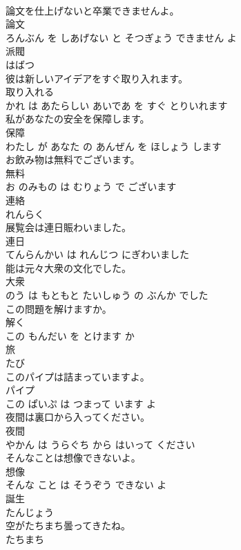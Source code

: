 \documentclass[8pt]{extreport}
\begin{document}
\begin{CJK}{UTF8}{min}
\\	論文を仕上げないと卒業できませんよ。	
\\	論文 
\\	ろんぶん を しあげない と そつぎょう できません よ			
\\	派閥	
\\	はばつ			
\\	彼は新しいアイデアをすぐ取り入れます。	
\\	取り入れる 
\\	かれ は あたらしい あいであ を すぐ とりいれます			
\\	私があなたの安全を保障します。	
\\	保障 
\\	わたし が あなた の あんぜん を ほしょう します			
\\	お飲み物は無料でございます。	
\\	無料 
\\	お のみもの は むりょう で ございます			
\\	連絡	
\\	れんらく			
\\	展覧会は連日賑わいました。	
\\	連日 
\\	てんらんかい は れんじつ にぎわいました			
\\	能は元々大衆の文化でした。	
\\	大衆 
\\	のう は もともと たいしゅう の ぶんか でした			
\\	この問題を解けますか。	
\\	解く 
\\	この もんだい を とけます か			
\\	旅	
\\	たび			
\\	このパイプは詰まっていますよ。	
\\	パイプ 
\\	この ぱいぷ は つまって います よ			
\\	夜間は裏口から入ってください。	
\\	夜間 
\\	やかん は うらぐち から はいって ください			
\\	そんなことは想像できないよ。	
\\	想像 
\\	そんな こと は そうぞう できない よ			
\\	誕生	
\\	たんじょう			
\\	空がたちまち曇ってきたね。	
\\	たちまち 

\end{CJK}
\end{document}
